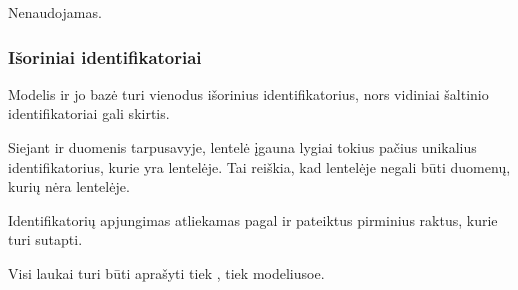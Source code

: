 \documentclass[letterpaper,10pt,lithuanian]{sphinxmanual}
\begin{document}

\begin{fulllineitems}
\label{\detokenize{dimensijos:base.access}}
\pysigstartsignatures
\pysigline
{}
\pysigstopsignatures
\sphinxAtStartPar
Nenaudojamas.

\end{fulllineitems}



\subsubsection{Išoriniai identifikatoriai}
\label{\detokenize{dimensijos:isoriniai-identifikatoriai}}
\sphinxAtStartPar
Modelis ir jo bazė turi vienodus išorinius identifikatorius, nors vidiniai
šaltinio identifikatoriai gali skirtis.

\sphinxAtStartPar
Siejant {\hyperref[\detokenize{formatas:model}]{}} ir {\hyperref[\detokenize{formatas:base}]{}} duomenis tarpusavyje, {\hyperref[\detokenize{formatas:model}]{}}
lentelė įgauna lygiai tokius pačius unikalius identifikatorius, kurie yra
{\hyperref[\detokenize{formatas:base}]{}} lentelėje. Tai reiškia, kad {\hyperref[\detokenize{formatas:model}]{}} lentelėje negali būti
duomenų, kurių nėra {\hyperref[\detokenize{formatas:base}]{}} lentelėje.

\sphinxAtStartPar
Identifikatorių apjungimas atliekamas pagal {\hyperref[\detokenize{dimensijos:model.ref}]{}} ir
{\hyperref[\detokenize{dimensijos:base.ref}]{}} pateiktus pirminius raktus, kurie turi sutapti.

\sphinxAtStartPar
Visi {\hyperref[\detokenize{dimensijos:base.ref}]{}} laukai turi būti aprašyti tiek {\hyperref[\detokenize{formatas:base}]{}}, tiek
{\hyperref[\detokenize{formatas:model}]{}} modeliusoe.
\end{document}
